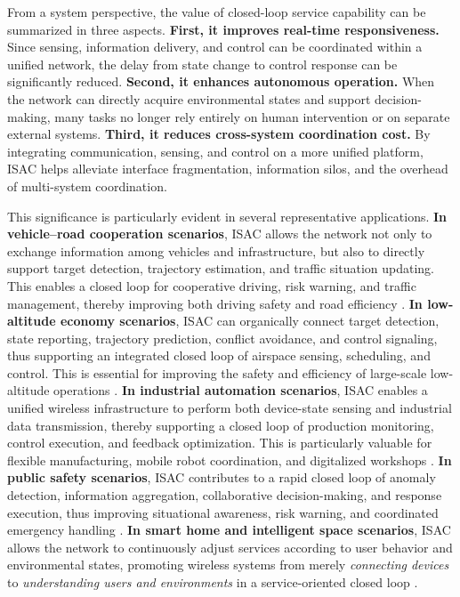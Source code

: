 From a system perspective, the value of closed-loop service capability can be summarized in three aspects.  
\textbf{First, it improves real-time responsiveness.} Since sensing, information delivery, and control can be coordinated within a unified network, the delay from state change to control response can be significantly reduced.  
\textbf{Second, it enhances autonomous operation.} When the network can directly acquire environmental states and support decision-making, many tasks no longer rely entirely on human intervention or on separate external systems.  
\textbf{Third, it reduces cross-system coordination cost.} By integrating communication, sensing, and control on a more unified platform, ISAC helps alleviate interface fragmentation, information silos, and the overhead of multi-system coordination.

This significance is particularly evident in several representative applications.  
\textbf{In vehicle--road cooperation scenarios}, ISAC allows the network not only to exchange information among vehicles and infrastructure, but also to directly support target detection, trajectory estimation, and traffic situation updating. This enables a closed loop for cooperative driving, risk warning, and traffic management, thereby improving both driving safety and road efficiency \cite{Kumari2018IEEE80211adRadar,Ma2026integrated,Feng2020JointRadarCommunication}.  
\textbf{In low-altitude economy scenarios}, ISAC can organically connect target detection, state reporting, trajectory prediction, conflict avoidance, and control signaling, thus supporting an integrated closed loop of airspace sensing, scheduling, and control. This is essential for improving the safety and efficiency of large-scale low-altitude operations \cite{Jiang2025integrated,Meng2023uav}.  
\textbf{In industrial automation scenarios}, ISAC enables a unified wireless infrastructure to perform both device-state sensing and industrial data transmission, thereby supporting a closed loop of production monitoring, control execution, and feedback optimization. This is particularly valuable for flexible manufacturing, mobile robot coordination, and digitalized workshops \cite{Akyildiz2020Industrial6G,Kaushik2024integrated,Sturm2011WaveformDesign}.  
\textbf{In public safety scenarios}, ISAC contributes to a rapid closed loop of anomaly detection, information aggregation, collaborative decision-making, and response execution, thus improving situational awareness, risk warning, and coordinated emergency handling \cite{Ma2022WiFiSensingSurvey,Liu2022ISAC,Zhang2021ISAC6G}.  
\textbf{In smart home and intelligent space scenarios}, ISAC allows the network to continuously adjust services according to user behavior and environmental states, promoting wireless systems from merely \emph{connecting devices} to \emph{understanding users and environments} in a service-oriented closed loop \cite{Ma2022WiFiSensingSurvey,Zhang2020device}.

